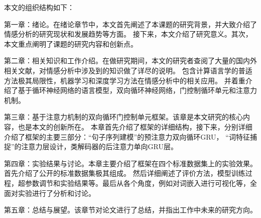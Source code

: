 本文的组织结构如下：

第一章：绪论。在绪论章节中，本文首先阐述了本课题的研究背景，并大致介绍了情感分析的研究现状和发展趋势等方面。
接下来，本文介绍了研究意义。其次，本文重点阐明了课题的研究内容和创新点。

第二章：相关知识和工作介绍。在做研究期间，本文的研究者查阅了大量的国内外相关文献，对情感分析中涉及到的知识做了详尽的说明。
包含计算语言学的普适方法极其局限性，机器学习和深度学习方法在情感分析中的相关应用。
并着重介绍了基于循环神经网络的语言模型，双向循环神经网络，门控制循环单元和注意力机制。

第三章：基于注意力机制的双向循环门控制单元框架。该章是本文研究的核心内容，也是本文的创新所在。
本章首先介绍了框架的详细结构，接下来，分别详细介绍了框架的主要三部分：“句子序列建模”的预注意力双向循环GRU，
“词特征捕捉”的注意力层设计，类解码器的后注意力单向GRU层。

第四章：实验结果与讨论。本章主要介绍了框架在四个标准数据集上的实验效果。首先介绍了公开的标准数据集极其组成。
然后详细阐述了评价方法，模型训练过程，超参数调节和实验结果等。最后从各个角度，例如对词嵌入进行可视化等，全面对实验进行了分析和讨论。

第五章：总结与展望。该章节对论文进行了总结，并指出工作中未来的研究方向。
